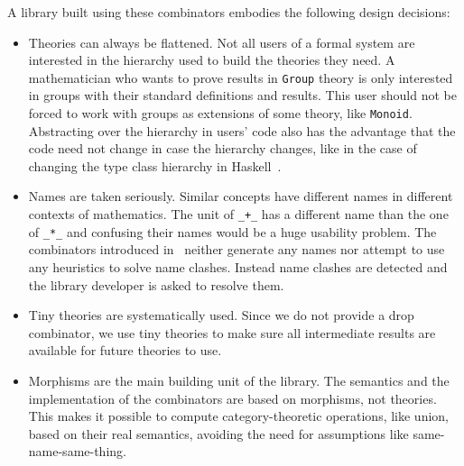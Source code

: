 A library built using these combinators embodies the following design decisions:
\begin{itemize}
    \item Theories can always be flattened. Not all users of a formal system are interested in the hierarchy used to build the theories they need. A mathematician who wants to prove results in \verb|Group| theory is only interested in groups with their standard definitions and results. This user should not be forced to work with groups as extensions of some theory, like \verb|Monoid|. Abstracting over the hierarchy in users' code also has the advantage that the code need not change in case the hierarchy changes, like in the case of changing the type class hierarchy in Haskell~\cite{wiki:haskell_hierarch}. 
    \item Names are taken seriously. Similar concepts have different names in different contexts of mathematics. The unit of \verb|_+_| has a different name than the one of \verb|_*_| and confusing their names would be a huge usability problem. The combinators introduced in~\cite{carette2018building} neither generate any names nor attempt to use any heuristics to solve name clashes. Instead name clashes are detected and the library developer is asked to resolve them.  
    \item Tiny theories are systematically used. Since we do not provide a drop combinator, we use tiny theories to make sure all intermediate results are available for future theories to use. 
    \item Morphisms are the main building unit of the library. The semantics and the implementation of the combinators are based on morphisms, not theories. This makes it possible to compute category-theoretic operations, like union, based on their real semantics, avoiding the need for assumptions like same-name-same-thing. 
\end{itemize}


